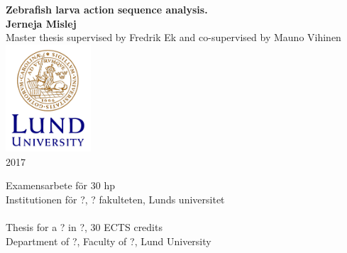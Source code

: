 \documentclass[a4paper,12pt]{article}
\begin{document}
\begin{titlepage}
\vfill
\begin{center}
{\large\bf Zebrafish larva action sequence analysis.}
\\[3cm]
{\bf Jerneja Mislej}
\\[2cm]
{Master thesis supervised by Fredrik Ek and co-supervised by Mauno Vihinen}
\\[5cm]
\includegraphics[height=4cm]{Lund_University_logotype.png}
\\[0.5cm]
{2017}
\\[2cm]
\end{center}
{Examensarbete för 30 hp\\
Institutionen för ?, ? fakulteten, Lunds universitet
\\
\\Thesis for a ? in ?, 30 ECTS credits
\\Department of ?, Faculty of ?, Lund University}

\end{titlepage}
\thispagestyle{empty} %

\end{document}
